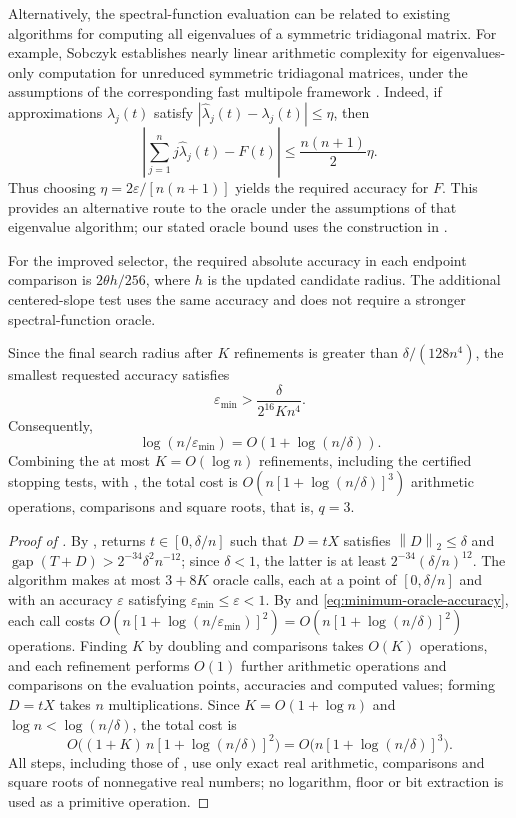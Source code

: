 \documentclass[10pt,a4paper]{article}
\newcommand{\norm}[1]{\left\lVert #1\right\rVert}
\DeclareMathOperator{\gap}{gap}
\begin{document}
Alternatively, the spectral-function evaluation
can be related to existing algorithms for computing
all eigenvalues of a symmetric tridiagonal matrix.
For example, Sobczyk establishes
nearly linear arithmetic complexity for eigenvalues-only
computation for unreduced symmetric tridiagonal matrices,
under the assumptions of the corresponding
fast multipole framework
\cite[Appendix~C.2, Corollary~C.1]{Sobczyk2025}. Indeed, if approximations
$\widehat\lambda_j(t)$ satisfy
$|\widehat\lambda_j(t)-\lambda_j(t)|\leq\eta$, then
\[
\left|
\sum_{j=1}^n j\widehat\lambda_j(t)-F(t)
\right|
\leq\frac{n(n+1)}2\eta.
\]
Thus choosing
$\eta=2\varepsilon/[n(n+1)]$ yields the required
accuracy for $F$. This provides an alternative
route to the oracle under the assumptions of that
eigenvalue algorithm; our stated oracle bound
uses the construction in .


For the improved selector, the required absolute
accuracy in each endpoint comparison is
$2\theta h/256$, where $h$ is the updated
candidate radius. The additional centered-slope
test uses the same accuracy and does not require
a stronger spectral-function oracle.

Since the final search radius after $K$ refinements
is greater than $\delta/(128n^4)$, the smallest
requested accuracy satisfies
\begin{equation}\label{eq:minimum-oracle-accuracy}
\boxed{
\varepsilon_{\min}>
\frac{\delta}{2^{16}Kn^4}.
}
\end{equation}
Consequently,
\[
\log(n/\varepsilon_{\min})
=O(1+\log(n/\delta)).
\]
Combining the at most $K=O(\log n)$ refinements,
including the certified stopping tests, with
, the total cost
is $O(n[1+\log(n/\delta)]^3)$ arithmetic operations,
comparisons and square roots, that is, $q=3$.

\begin{proof}[Proof of ]
By ,  returns
$t\in[0,\delta/n]$ such that $D=tX$ satisfies
$\norm{D}_2\leq\delta$ and
$\gap(T+D)>2^{-34}\delta^2n^{-12}$; since $\delta<1$,
the latter is at least $2^{-34}(\delta/n)^{12}$.
The algorithm makes at most $3+8K$ oracle calls, each at a
point of $[0,\delta/n]$ and with an accuracy $\varepsilon$
satisfying $\varepsilon_{\min}\leq\varepsilon<1$.
By  and
\eqref{eq:minimum-oracle-accuracy}, each call costs
$O(n[1+\log(n/\varepsilon_{\min})]^2)
=O(n[1+\log(n/\delta)]^2)$
operations. Finding $K$ by doubling and comparisons takes
$O(K)$ operations, and each refinement performs $O(1)$
further arithmetic operations and comparisons on the
evaluation points, accuracies and computed values; forming
$D=tX$ takes $n$ multiplications. Since
$K=O(1+\log n)$ and $\log n<\log(n/\delta)$, the total
cost is
\[
O\bigl((1+K)\,n[1+\log(n/\delta)]^2\bigr)
=O\bigl(n[1+\log(n/\delta)]^3\bigr).
\]
All steps, including those of , use only
exact real arithmetic, comparisons and square roots of
nonnegative real numbers; no logarithm, floor or bit
extraction is used as a primitive operation.
\end{proof}
\end{document}
